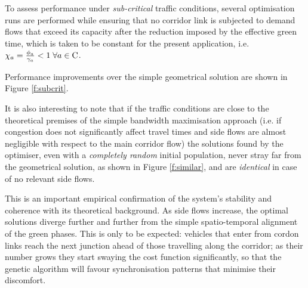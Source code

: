 To assess performance under \emph{sub-critical} traffic conditions, several optimisation runs are performed while ensuring that no corridor link is subjected to demand flows that exceed its capacity after the reduction imposed by the effective green time, which is taken to be constant for the present application, i.e. $\chi_{a} = \frac{\phi_a}{\gamma_a} < 1 \; \forall a \in \mathrm{C}$.

Performance improvements over the simple geometrical solution are shown in Figure \ref{f:subcrit}. 


It is also interesting to note that if the traffic conditions are close to the theoretical premises of the simple bandwidth maximisation approach (i.e. if congestion does not significantly affect travel times and side flows are almost negligible with respect to the main corridor flow) the solutions found by the optimiser, even with a \emph{completely random} initial population, never stray far from the geometrical solution, as shown in Figure \ref{f:similar}, and are \emph{identical} in case of no relevant side flows.


This is an important empirical confirmation of the system's stability and coherence with its theoretical background. As side flows increase, the optimal solutions diverge further and further from the simple spatio-temporal alignment of the green phases. This is only to be expected: vehicles that enter from cordon links reach the next junction ahead of those travelling along the corridor; as their number grows they start swaying the cost function significantly, so that the genetic algorithm will favour synchronisation patterns that minimise their discomfort.

